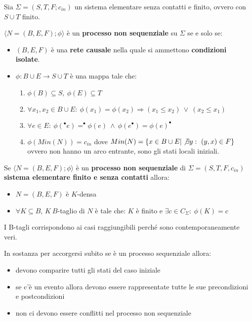 \begin{definizione}
    Sia $\Sigma = (S, T, F; c_{in})$ un sistema elementare senza contatti e finito,
    ovvero con $S \cup T$ finito.

    $\langle N = (B, E, F); \phi \rangle$ è un \textbf{processo non sequenziale}
    su $\Sigma$ se e solo se:
    \begin{itemize}
        \item $(B, E, F)$ è una \textbf{rete causale} nella quale si ammettono \textbf{condizioni
              isolate}.
        \item $\phi: B \cup E \to S \cup T$ è una mappa tale che:
              \begin{enumerate}
                  \item $\phi(B) \subseteq S, \ \phi(E) \subseteq T$
                  \item $\forall x_1, x_2 \in B \cup E: \ \phi(x_1) = \phi(x_2)
                            \Rightarrow (x_1 \leq x_2) \ \lor \ (x_2 \leq x_1)$
                  \item $\forall e \in E: \ \phi(^{\bullet}e) = ^{\bullet}\phi(e)
                            \ \land \ \phi(e^{\bullet}) = \phi(e)^{\bullet}$
                  \item $\phi(Min(N)) = c_{in}$ dove
                        $Min(N) = \{x \in B \cup E | \not\exists y: \ (y, x) \in F\}$
                        ovvero non hanno un arco entrante, sono gli stati locali
                        iniziali.
              \end{enumerate}
    \end{itemize}
\end{definizione}
Se $\langle N = (B, E, F); \phi \rangle$ è un \textbf{processo non sequenziale} di
$\Sigma = (S, T, F, c_{in})$ \textbf{sistema elementare finito e senza contatti} allora:
\begin{itemize}
    \item $N = (B, E, F)$ è $K$-densa
    \item $\forall K \subseteq B$, $K\ B$-taglio di $N$ è tale che: $K$ è finito e
          $\exists c \in C_{\Sigma}: \ \phi(K) = c$
\end{itemize}
I B-tagli corrispondono ai casi raggiungibili perché sono contemporaneamente veri.
\begin{nota}
    In sostanza per accorgersi subito se è un processo sequenziale allora:
    \begin{itemize}
        \item devono comparire tutti gli stati del caso iniziale
        \item se c'è un evento allora devono essere rappresentate tutte le sue 
        precondizioni e postcondizioni
        \item non ci devono essere conflitti nel processo non sequenziale
    \end{itemize} 
\end{nota}
